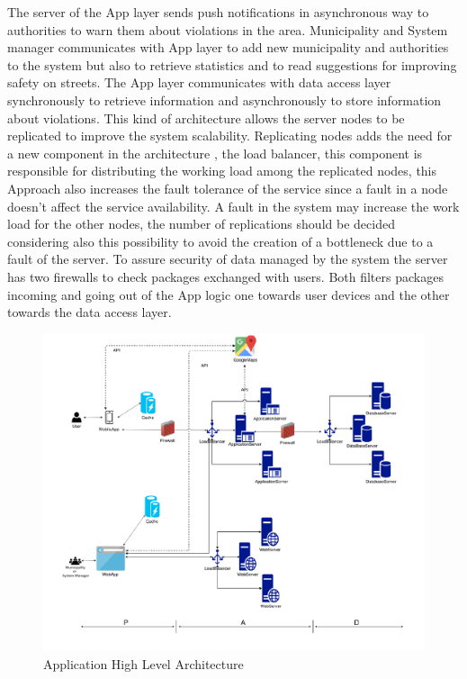 The server of the App layer sends push notifications in asynchronous way to authorities to warn them about violations in the area.
Municipality and System manager communicates with App layer to add new municipality and authorities to the system but also to retrieve statistics and to read suggestions for improving safety on streets.
The App layer communicates with data access layer synchronously to retrieve information and asynchronously to store information about violations.
This kind of architecture allows the server nodes to be replicated to improve the system scalability.
Replicating nodes adds the need for a new component in the architecture , the load balancer, this component is responsible for distributing the working load among the replicated nodes, this Approach also increases the fault tolerance of the service since a fault in a node doesn't affect the service availability. A fault in the system may increase the work load for the other nodes, the number of replications should be decided considering also this possibility to avoid the creation of a bottleneck due to a fault of the server.
To assure security of data managed by the system the server has two firewalls to check packages exchanged with users. Both filters packages incoming and going out of the App logic one towards user devices and the other towards the data access layer.
\newpage
\begin{figure}[H]
\centering
\includegraphics[width=\textwidth]{Images/Architecture.png}
\caption{\label{fig:ComWI}Application High Level Architecture}
\end{figure}
